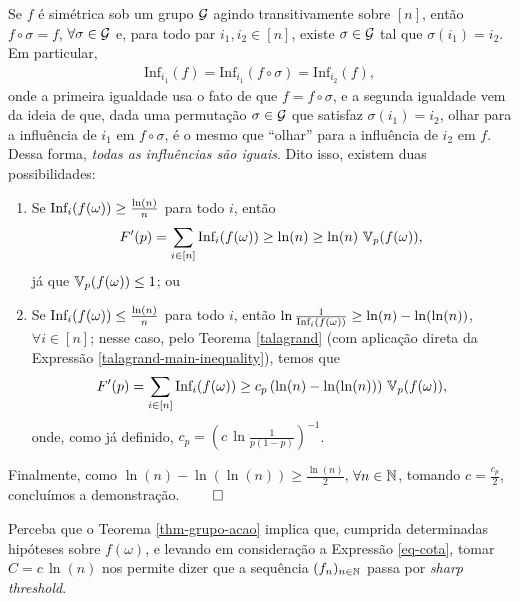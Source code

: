 \par Se $f$ é simétrica sob um grupo $\operatorname{\mathcal{G}}$ agindo transitivamente sobre $[n]$, então $f \circ \sigma = f$, $\forall \sigma \in \operatorname{\mathcal{G}}$ e, para todo par $i_1, i_2 \in [n]$, existe $\sigma \in \operatorname{\mathcal{G}}$ tal que $\sigma(i_1) = i_2$. Em particular, 
\begin{align*}
	\text{Inf}_{i_1}(f) = \text{Inf}_{i_1}(f \circ \sigma) = \text{Inf}_{i_2}(f),
\end{align*}
onde a primeira igualdade usa o fato de que $f = f \circ \sigma$, e a segunda igualdade vem da ideia de que, dada uma permutação $\sigma \in \operatorname{\mathcal{G}}$ que satisfaz $\sigma(i_1) = i_2$, olhar para a influência de $i_1$ em $f \circ \sigma$, é o mesmo que ``olhar'' para a influência de $i_2$ em $f$. Dessa forma, \textit{todas as influências são iguais}. Dito isso, existem duas possibilidades:
\begin{enumerate}
	\item Se $\text{Inf}_i(f(\omega)) \geq \frac{\ln(n)}{n}$ para todo $i$, então
		\begin{align*}
			F'(p) = \sum_{i \in [n]} \text{Inf}_i(f(\omega)) \geq \ln(n) \geq \ln(n) \, \operatorname{\mathbb{V}}_p(f(\omega)),
		\end{align*}
		já que $\operatorname{\mathbb{V}}_p(f(\omega)) \leq 1$; ou
	\item Se $\text{Inf}_i(f(\omega)) \leq \frac{\ln(n)}{n}$ para todo $i$, então $\ln \frac{1}{\text{Inf}_i(f(\omega))} \geq \ln(n) - \ln(\ln(n))$, $\forall i \in [n]$; nesse caso, pelo Teorema \ref{talagrand} (com aplicação direta da Expressão \eqref{talagrand-main-inequality}), temos que
		\begin{align*}
		F'(p) = \sum_{i \in [n]} \text{Inf}_i(f(\omega)) \geq c_p \, (\ln(n) - \ln(\ln(n))) \, \operatorname{\mathbb{V}}_p(f(\omega)),
		\end{align*}
		onde, como já definido, $c_p = \left(c \, \ln \frac{1}{p(1 - p)}\right)^{-1}$.
\end{enumerate}

\par Finalmente, como $\ln(n) - \ln(\ln(n)) \geq \frac{\ln(n)}{2}$, $\forall n \in \operatorname{\mathbb{N}}$, tomando $c = \frac{c_p}{2}$, concluímos a demonstração. \hspace{\fill}$\qed$

\par Perceba que o Teorema \ref{thm-grupo-acao} implica que, cumprida determinadas hipóteses sobre $f(\omega)$, e levando em consideração a Expressão \eqref{eq-cota}, tomar $C = c \, \ln(n)$ nos permite dizer que a sequência $(f_n)_{n \in \operatorname{\mathbb{N}}}$ passa por \textit{sharp threshold}.

